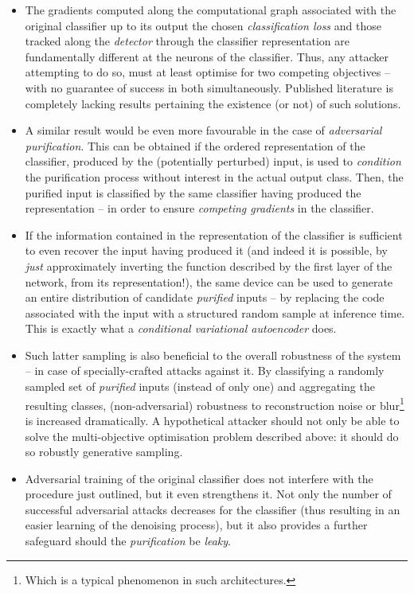 \begin{itemize}
    \item The gradients computed along the computational graph associated with the original classifier up to its output \wrt the chosen \textit{classification loss} and those tracked along the \textit{detector} through the classifier representation are fundamentally different at the neurons of the classifier. Thus, any attacker attempting to do so, must at least optimise for two competing objectives -- with no guarantee of success in both simultaneously. Published literature is completely lacking results pertaining the existence (or not) of such solutions.
    \item A similar result would be even more favourable in the case of \textit{adversarial purification}. This can be obtained if the ordered representation of the classifier, produced by the (potentially perturbed) input, is used to \textit{condition} the purification process without interest in the actual output class. Then, the purified input is classified by the same classifier having produced the representation -- in order to ensure \textit{competing gradients} in the classifier.
    \item If the information contained in the representation of the classifier is sufficient to even recover the input having produced it (and indeed it is possible, by \textit{just} approximately inverting the function described by the first layer of the network, from its representation!), the same device can be used to generate an entire distribution of candidate \textit{purified} inputs -- by replacing the code associated with the input with a structured random sample at inference time. This is exactly what a \textit{conditional variational autoencoder} does.
    \item Such latter sampling is also beneficial to the overall robustness of the system -- in case of specially-crafted attacks against it. By classifying a randomly sampled set of \textit{purified} inputs (instead of only one) and aggregating the resulting classes, (non-adversarial) robustness to reconstruction noise or blur\footnote{Which is a typical phenomenon in such architectures.} is increased dramatically. A hypothetical attacker should not only be able to solve the multi-objective optimisation problem described above: it should do so robustly \wrt generative sampling.
    \item Adversarial training of the original classifier does not interfere with the procedure just outlined, but it even strengthens it. Not only the number of successful adversarial attacks decreases for the classifier (thus resulting in an easier learning of the denoising process), but it also provides a further safeguard should the \textit{purification} be \textit{leaky}.
\end{itemize}

